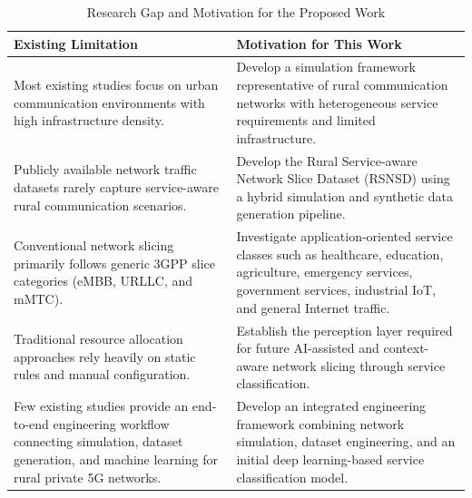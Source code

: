 \documentclass[12pt,a4paper]{report}
\begin{document}
	\begin{table}[H]
		\centering
		\caption{Research Gap and Motivation for the Proposed Work}
		\label{tab:research_gap}
		
		\begin{tabular}{|p{6.2cm}|p{6.2cm}|}
			\hline
			
			\textbf{Existing Limitation} &
			\textbf{Motivation for This Work}
			\\
			\hline
			
			Most existing studies focus on urban communication environments with high infrastructure density. &
			Develop a simulation framework representative of rural communication networks with heterogeneous service requirements and limited infrastructure.
			\\
			\hline
			
			Publicly available network traffic datasets rarely capture service-aware rural communication scenarios. &
			Develop the Rural Service-aware Network Slice Dataset (RSNSD) using a hybrid simulation and synthetic data generation pipeline.
			\\
			\hline
			
			Conventional network slicing primarily follows generic 3GPP slice categories (eMBB, URLLC, and mMTC). &
			Investigate application-oriented service classes such as healthcare, education, agriculture, emergency services, government services, industrial IoT, and general Internet traffic.
			\\
			\hline
			
			Traditional resource allocation approaches rely heavily on static rules and manual configuration. &
			Establish the perception layer required for future AI-assisted and context-aware network slicing through service classification.
			\\
			\hline
			
			Few existing studies provide an end-to-end engineering workflow connecting simulation, dataset generation, and machine learning for rural private 5G networks. &
			Develop an integrated engineering framework combining network simulation, dataset engineering, and an initial deep learning-based service classification model.
			\\
			\hline
			
		\end{tabular}
		
	\end{table}
	
\end{document}
